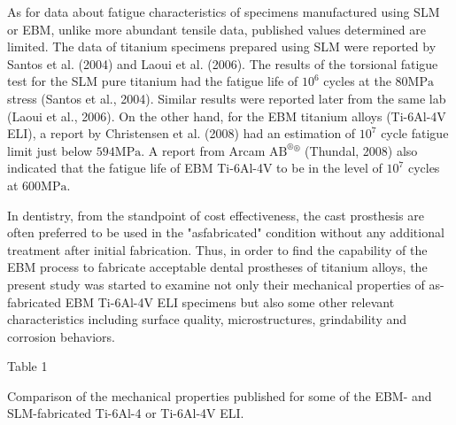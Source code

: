 \documentclass[10pt]{article}
\begin{document}
As for data about fatigue characteristics of specimens manufactured using SLM or EBM, unlike more abundant tensile data, published values determined are limited. The data of titanium specimens prepared using SLM were reported by Santos et al. (2004) and Laoui et al. (2006). The results of the torsional fatigue test for the SLM pure titanium had the fatigue life of $10^{6}$ cycles at the $80 \mathrm{MPa}$ stress (Santos et al., 2004). Similar results were reported later from the same lab (Laoui et al., 2006). On the other hand, for the EBM titanium alloys (Ti-6Al-4V ELI), a report by Christensen et al. (2008) had an estimation of $10^{7}$ cycle fatigue limit just below $594 \mathrm{MPa}$. A report from Arcam $\mathrm{AB}^{\circledR}{ }^{\circledR}$ (Thundal, 2008) also indicated that the fatigue life of EBM Ti-6Al-4V to be in the level of $10^{7}$ cycles at $600 \mathrm{MPa}$.

In dentistry, from the standpoint of cost effectiveness, the cast prosthesis are often preferred to be used in the "asfabricated" condition without any additional treatment after initial fabrication. Thus, in order to find the capability of the EBM process to fabricate acceptable dental prostheses of titanium alloys, the present study was started to examine not only their mechanical properties of as-fabricated EBM Ti-6Al-4V ELI specimens but also some other relevant characteristics including surface quality, microstructures, grindability and corrosion behaviors.

Table 1

Comparison of the mechanical properties published for some of the EBM- and SLM-fabricated Ti-6Al-4 or Ti-6Al-4V ELI.
\end{document}
